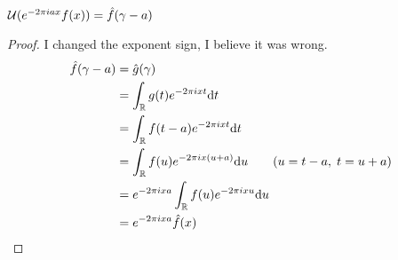 $\mathcal{U}(e^{-2 \pi i a x } f(x)) = \hat{f}(\gamma - a)$
\begin{proof}
    I changed the exponent sign, I believe it was wrong.
    \begin{align*}
        \hat{f}(\gamma - a) &= \hat{g}(\gamma)\\
        &= \int_{\mathbb{R}} g(t) e^{-2\pi i x t} \dd t \\
        &= \int_{\mathbb{R}} f(t-a)e^{-2\pi i x t} \dd t \\
        &=  \int_{\mathbb{R}} f(u)e^{-2\pi i x (u+a)} \dd u \tag{$u=t-a,\; t = u+a$} \\
        &= e^{-2\pi i x a} \int_{\mathbb{R}} f(u)e^{-2\pi i x u} \dd u \\
        &= e^{-2\pi i x a} \hat{f}(x)
    \end{align*}
\end{proof}